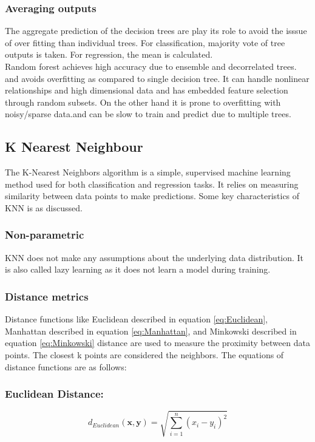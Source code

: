 \documentclass[12pt, a4paper, twoside]{report}
\theoremstyle{plain} %
\theoremstyle{definition} %
\theoremstyle{remark} %
\numberwithin{equation}{chapter}
\begin{document}
\subsubsection{Averaging outputs} The aggregate prediction of the decision trees are play its role to avoid the isssue of over fitting than individual  trees. For classification, majority vote of tree outputs is taken. For regression, the mean is calculated.\\

Random forest achieves high accuracy due to ensemble and decorrelated trees.
and avoids overfitting as compared to single decision tree. It can handle nonlinear relationships and high dimensional data and has embedded feature selection through random subsets. On the other hand it is prone to overfitting with noisy/sparse data.and can be slow to train and predict due to multiple trees.
\subsection{K Nearest Neighbour}
The K-Nearest Neighbors algorithm is a simple, supervised machine learning method used for both classification and regression tasks. It relies on measuring similarity between data points to make predictions. Some key characteristics of KNN is as discussed.

\subsubsection{Non-parametric} KNN does not make any assumptions about the underlying data distribution. It is also called lazy learning as it does not learn a model during training.
\subsubsection{Distance metrics} Distance functions like Euclidean described in equation \ref{eq:Euclidean}, Manhattan described in equation \ref{eq:Manhattan}, and Minkowski described in equation \ref{eq:Minkowski} distance are used to measure the proximity between data points. The closest k points are considered the neighbors. The equations of distance functions are as follows:\\
\subsubsection{Euclidean Distance:}
\begin{equation}
\label{eq:Euclidean}
d_{Euclidean}(\mathbf{x}, \mathbf{y}) = \sqrt{\sum_{i=1}^{n}(x_i - y_i)^2}
\end{equation}
\end{document}
